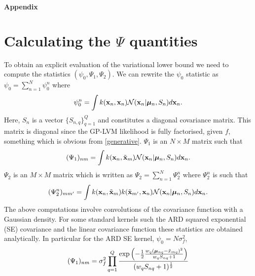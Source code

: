\newpage
 \begin{center}
 \begin{Large}
 \textbf{
 Appendix
 } \\
 \end{Large}
 \end{center}
\appendix


\section{Calculating the $\Psi$ quantities \label{PsiQuantities}}
To obtain an explicit evaluation of the variational lower bound we
need to compute the statistics $(\psi_0,\Psi_1,\Psi_2)$. We can
rewrite the $\psi_0$ statistic as $\psi_0 = \sum_{n=1}^N \psi_0^n$
where
\begin{equation}
\psi_0^n = \int k(\mathbf{x}_n,\mathbf{x}_n) \mathcal{N}(\mathbf{x}_n |\boldsymbol \mu_n , S_n) d \mathbf{x}_n.
\label{eq:psi0}
\end{equation}
Here, $S_n$ is a vector $\{ S_{n,q}\}_{q=1}^Q$ and constitutes a diagonal
covariance matrix. This matrix is diagonal since the GP-LVM likelihood is
fully factorised, given $f$, something which is obvious from \eqref{generative}.
%
$\Psi_1$ is an $N \times M$ matrix such that  
\begin{equation}
  (\Psi_1)_{nm} = \int k(\mathbf{x}_n,\tilde{\mathbf{x}}_m) \mathcal{N}(\mathbf{x}_n|\boldsymbol \mu_n, S_n) d
  \mathbf{x}_n.
\label{eq:psi1}
\end{equation}
$\Psi_2$ is an $M \times M$ matrix which is written as
 $\Psi_2 = \sum_{n=1}^N \Psi_2^n$ where $\Psi_2^n$ is such that 
\begin{equation}
  (\Psi^n_2)_{m m'} = \int k(\mathbf{x}_n,\tilde{\mathbf{x}}_m)
  k(\tilde{\mathbf{x}}_{m'},\mathbf{x}_n) \mathcal{N}(\mathbf{x}_n|\boldsymbol \mu_n, S_n) d \mathbf{x}_n.
\label{eq:psi2}
\end{equation}
The above computations involve convolutions of the covariance function
with a Gaussian density. For some standard kernels such the ARD
squared exponential (SE) covariance and the linear covariance function
these statistics are obtained analytically. In particular for the ARD
SE kernel, $\psi_0 = N \sigma_f^2$,
$$
(\Psi_1)_{nm} = \sigma^2_f \prod_{q=1}^Q
\frac{ \exp \left( - \frac{1}{2} \frac{ w_q (\boldsymbol \mu_{nq}  -
       \tilde{x}_{mq})^2}{w_q S_{nq} + 1} \right)
    }
    {( w_q S_{nq} + 1)^{\frac{1}{2}}
    } 
$$ 
